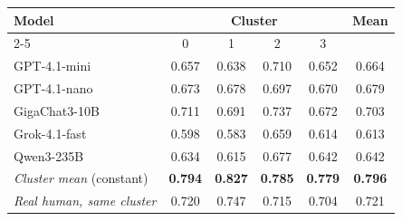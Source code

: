 \begin{tabular}{lccccc}
\toprule
Model & \multicolumn{4}{c}{Cluster} & Mean\\
\cmidrule(lr){2-5}
 & 0 & 1 & 2 & 3 & \\
\midrule
GPT-4.1-mini & 0.657 & 0.638 & 0.710 & 0.652 & 0.664\\
GPT-4.1-nano & 0.673 & 0.678 & 0.697 & 0.670 & 0.679\\
GigaChat3-10B & 0.711 & 0.691 & 0.737 & 0.672 & 0.703\\
Grok-4.1-fast & 0.598 & 0.583 & 0.659 & 0.614 & 0.613\\
Qwen3-235B & 0.634 & 0.615 & 0.677 & 0.642 & 0.642\\
\midrule
\textit{Cluster mean} (constant) & \textbf{0.794} & \textbf{0.827} & \textbf{0.785} & \textbf{0.779} & \textbf{0.796}\\
\textit{Real human, same cluster} & 0.720 & 0.747 & 0.715 & 0.704 & 0.721\\
\bottomrule
\end{tabular}